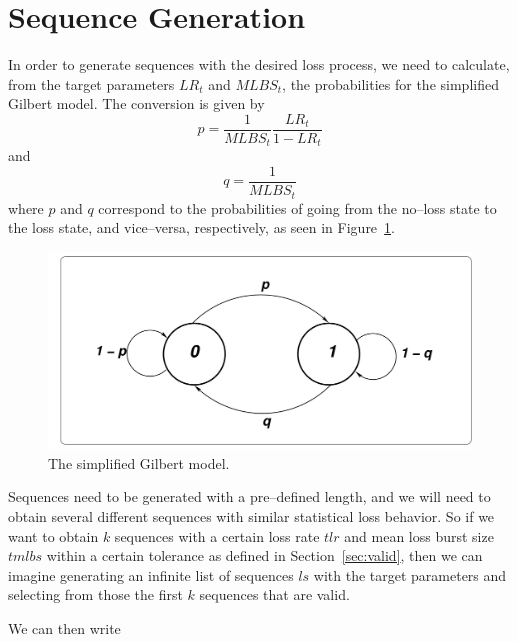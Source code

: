\documentclass{article}
\begin{document}
\section{Sequence Generation}

In order to generate sequences with the desired loss process, we need to
calculate, from the target parameters $LR_t$ and $MLBS_t$, the probabilities for
the simplified Gilbert model. The conversion is given by
$$
 p = \frac{1}{MLBS_t}\frac{LR_t}{1-LR_t}
$$
and 
$$
q = \frac{1}{MLBS_t}
$$
where $p$ and $q$ correspond to the probabilities of going from the no--loss
state to the loss state, and vice--versa, respectively, as seen in Figure~\ref{fig:gilbert}.  

\begin{figure}[h]
\centering
\includegraphics[scale=0.2]{figs/gilbert_simplified.pdf}
\caption{The simplified Gilbert model.}
\label{fig:gilbert}
\end{figure}


Sequences need to be generated with a pre--defined length, and we will need to
obtain several different sequences with similar statistical loss behavior. So if
we want to obtain $k$ sequences with a certain loss rate $tlr$ and mean loss
burst size $tmlbs$ within a certain tolerance as defined in
Section~\ref{sec:valid}, then we can imagine generating an infinite list of
sequences $ls$ with the target parameters and selecting from those the first $k$
sequences that are valid.

We can then write
\end{document}
